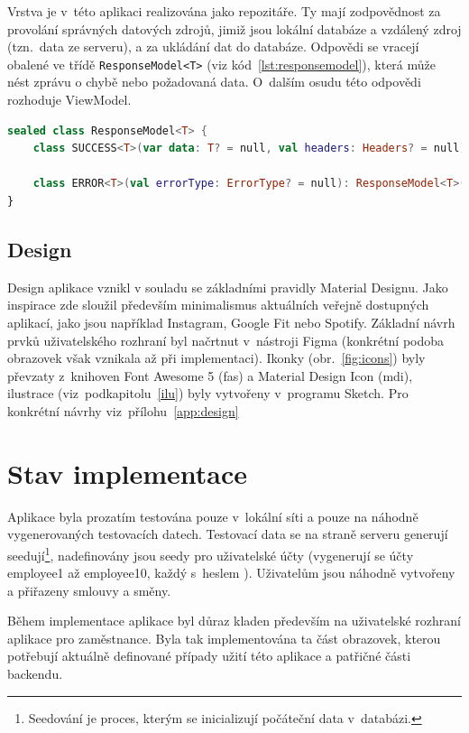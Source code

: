 \documentclass[twoside]{ctuthesis}
\begin{document}
Vrstva je v~této aplikaci realizována jako repozitáře. Ty mají zodpovědnost za provolání správných datových zdrojů, jimiž jsou lokální databáze a vzdálený zdroj (tzn.~data ze serveru), a za ukládání dat do databáze. Odpovědi se vracejí obalené ve třídě \texttt{ResponseModel<T>} (viz kód~\ref{lst:responsemodel}), která může nést zprávu o chybě nebo požadovaná data. O~dalším osudu této odpovědi rozhoduje ViewModel.

\begin{lstlisting}[language=Kotlin,caption={Třída \texttt{ResponseModel}},label={lst:responsemodel}]
sealed class ResponseModel<T> {
	class SUCCESS<T>(var data: T? = null, val headers: Headers? = null): ResponseModel<T>()

	class ERROR<T>(val errorType: ErrorType? = null): ResponseModel<T>()
}
\end{lstlisting}

\section{Design}\label{design}

Design aplikace vznikl v souladu se základními pravidly Material Designu. Jako inspirace zde sloužil především minimalismus aktuálních veřejně dos\-tup\-ných aplikací, jako jsou například Instagram, Google Fit nebo Spotify. Základní návrh prvků uživatelského rozhraní byl načrtnut v~nástroji Figma (konkrétní podoba obrazovek však vznikala až při implementaci). Ikonky (obr.~\ref{fig:icons}) byly převzaty z~knihoven Font Awesome 5 (fas) a Material Design Icon (mdi), ilustrace (viz~podkapitolu~\ref{ilu}) byly vytvořeny v~programu Sketch. Pro konkrétní návrhy viz~přílohu~\ref{app:design}

\chapter{Stav implementace}

Aplikace byla prozatím testována pouze v~lokální síti a pouze na náhodně vygenerovaných testovacích datech. Testovací data se na straně serveru generují seedují\footnote{Seedování je proces, kterým se inicializují počáteční data v~databázi.}, nadefinovány jsou seedy pro uživatelské účty (vygenerují se účty employee1 až employee10, každý s~heslem ). Uživatelům jsou náhodně vytvořeny a přiřazeny smlouvy a směny.

Během implementace aplikace byl důraz kladen především na uživatelské rozhraní aplikace pro zaměstnance. Byla tak implementována ta část obrazovek, kterou potřebují aktuálně definované případy užití této aplikace a patřičné části backendu.
\end{document}
